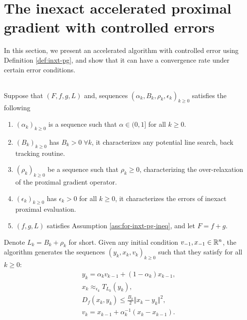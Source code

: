 \documentclass[12pt]{article}
\begin{document}
\section{The inexact accelerated proximal gradient with controlled errors}
    In this section, we present an accelerated algorithm with controlled error using Definition \ref{def:inxt-pg}, and show that it can have a convergence rate under certain error conditions. 
    \begin{definition}\;\label{def:inxt-apg}\\
        Suppose that $(F, f, g, L)$ and, sequences $(\alpha_k, B_k, \rho_k, \epsilon_k)_{k \ge 0}$ satisfies the following
        \begin{enumerate}[nosep]
            \item $(\alpha_k)_{k \ge 0}$ is a sequence such that $\alpha \in (0, 1]$ for all $k \ge 0$. 
            \item $(B_k)_{k \ge 0}$ has $B_k > 0\; \forall k$, it characterizes any potential line search, back tracking routine. 
            \item $(\rho_k)_{k \ge 0}$ be a sequence such that $\rho_k \ge 0$, characterizing the over-relaxation of the proximal gradient operator. 
            \item $(\epsilon_k)_{k \ge 0}$ has $\epsilon_k > 0$ for all $k \ge 0$, it characterizes the errors of inexact proximal evaluation.
            \item $(f, g, L)$ satisfies Assumption \ref{ass:for-inxt-pg-ineq}, and let $F = f + g$. 
        \end{enumerate}
        Denote $L_k = B_k + \rho_k$ for short. 
        Given any initial condition $v_{-1}, x_{-1} \in \mathbb R^n$, the algorithm generates the sequences $(y_k, x_k, v_k)_{k \ge 0}$ such that they satisfy for all $k \ge 0$: 
        \begin{align*}
            & y_k = \alpha_k v_{k - 1} + (1 - \alpha_k)x_{k - 1}, 
            \\
            & x_k \approx_{\epsilon_k} T_{L_k}(y_k), 
            \\
            & D_f(x_k, y_k) \le \frac{B_k}{2}\Vert x_k - y_k\Vert^2, 
            \\
            & v_k = x_{k - 1} + \alpha_k^{-1}(x_k - x_{k - 1}). 
        \end{align*}
    \end{definition}
\end{document}
